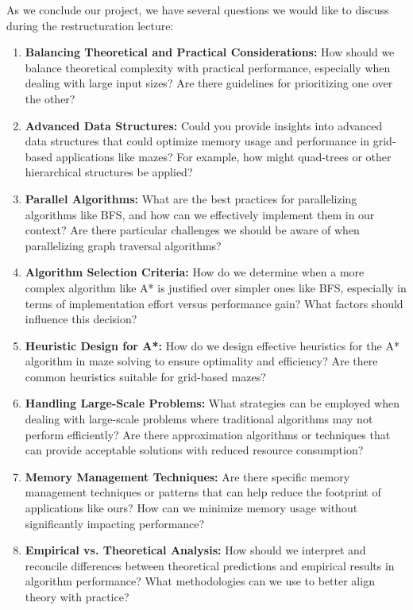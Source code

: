 \documentclass{article}
\begin{document}
As we conclude our project, we have several questions we would like to discuss during the restructuration lecture:

\begin{enumerate}
    \item \textbf{Balancing Theoretical and Practical Considerations:} How should we balance theoretical complexity with practical performance, especially when dealing with large input sizes? Are there guidelines for prioritizing one over the other?

    \item \textbf{Advanced Data Structures:} Could you provide insights into advanced data structures that could optimize memory usage and performance in grid-based applications like mazes? For example, how might quad-trees or other hierarchical structures be applied?

    \item \textbf{Parallel Algorithms:} What are the best practices for parallelizing algorithms like BFS, and how can we effectively implement them in our context? Are there particular challenges we should be aware of when parallelizing graph traversal algorithms?

    \item \textbf{Algorithm Selection Criteria:} How do we determine when a more complex algorithm like A* is justified over simpler ones like BFS, especially in terms of implementation effort versus performance gain? What factors should influence this decision?

    \item \textbf{Heuristic Design for A*:} How do we design effective heuristics for the A* algorithm in maze solving to ensure optimality and efficiency? Are there common heuristics suitable for grid-based mazes?

    \item \textbf{Handling Large-Scale Problems:} What strategies can be employed when dealing with large-scale problems where traditional algorithms may not perform efficiently? Are there approximation algorithms or techniques that can provide acceptable solutions with reduced resource consumption?

    \item \textbf{Memory Management Techniques:} Are there specific memory management techniques or patterns that can help reduce the footprint of applications like ours? How can we minimize memory usage without significantly impacting performance?

    \item \textbf{Empirical vs. Theoretical Analysis:} How should we interpret and reconcile differences between theoretical predictions and empirical results in algorithm performance? What methodologies can we use to better align theory with practice?

\end{enumerate}
\end{document}
